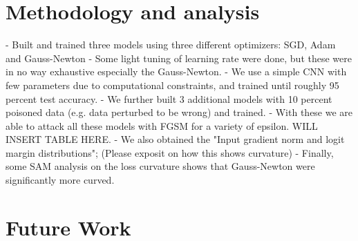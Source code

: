 \documentclass{article}
\begin{document}
\section{Methodology and analysis}
- Built and trained three models using three different optimizers: SGD, Adam and Gauss-Newton
    - Some light tuning of learning rate were done, but these were in no way exhaustive especially the Gauss-Newton.
- We use a simple CNN with few parameters due to computational constraints, and trained until roughly 95 percent test accuracy.
    - We further built 3 additional models with 10 percent poisoned data (e.g. data perturbed to be wrong) and trained.
- With these we are able to attack all these models with FGSM for a variety of epsilon. WILL INSERT TABLE HERE.
- We also obtained the "Input gradient norm and logit margin distributions"; (Please exposit on how this shows curvature)
- Finally, some SAM analysis on the loss curvature shows that Gauss-Newton were significantly more curved.

\section{Future Work}
\end{document}
